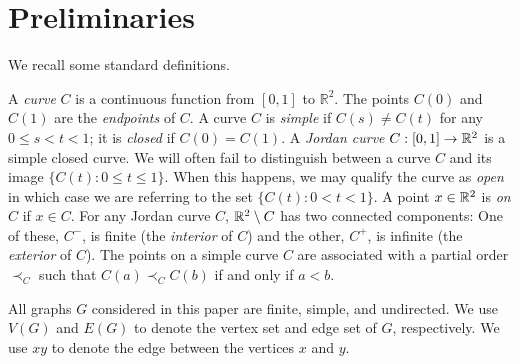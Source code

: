 \section{%
  Preliminaries}

We recall some %
standard definitions. %


%
A \emph{curve} $C$ is a continuous function from $[0,1]$
to $\mathbb{R}^2$.  The points $C(0)$ and $C(1)$ are the \emph{endpoints} of $C$.  A curve $C$ is \emph{simple} if $C(s)\neq C(t)$
for any $0\le s<t< 1$; it is \emph{closed} if $C(0)=C(1)$.  A \emph{Jordan
	curve} $C:[0,1]\to\mathbb{R}^2$ is a simple closed curve.  
We will often fail to distinguish between a curve $C$ and its
image $\{C(t):0\le t\le 1\}$.  When this happens, we may qualify the curve as
\emph{open} in which case we are referring to the set $\{C(t):0< t< 1\}$.
A point $x\in\mathbb{R}^2$ is \emph{on} $C$ if $x\in C$.  
%
For any Jordan curve $C$, $\mathbb{R}^2\setminus C$ has two connected
components: One of these, $C^-$, is finite (the {\em interior} of $C$) and the other, $C^+$, is
infinite (the {\em exterior} of $C$).  
%
The points on a simple curve $C$ are associated with a partial order $\prec_C$ such that $C(a)\prec_C C(b)$ if and only if $a<b$.  


All graphs $G$ considered in this paper are finite, simple, and
undirected.   We use $V(G)$ and $E(G)$ to denote the vertex set and edge
set of $G$, respectively.
We use $xy$
to denote the edge between the vertices %
$x$ and $y$. %

